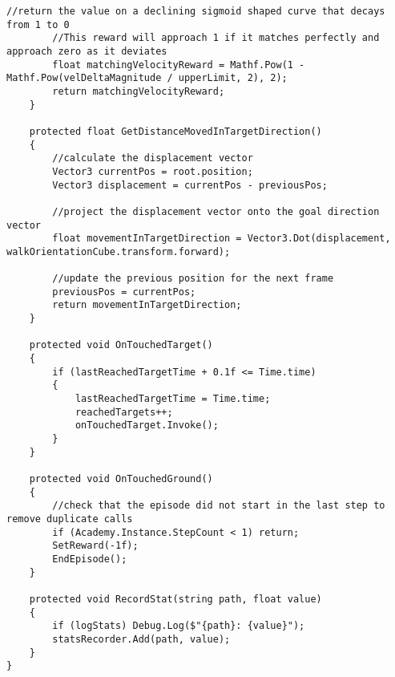 \begin{lstlisting}[caption={Agenten Skript},captionpos=b,label={lst:skript_agent1}]
        //return the value on a declining sigmoid shaped curve that decays from 1 to 0
        //This reward will approach 1 if it matches perfectly and approach zero as it deviates
        float matchingVelocityReward = Mathf.Pow(1 - Mathf.Pow(velDeltaMagnitude / upperLimit, 2), 2);
        return matchingVelocityReward;
    }

    protected float GetDistanceMovedInTargetDirection()
    {
        //calculate the displacement vector
        Vector3 currentPos = root.position;
        Vector3 displacement = currentPos - previousPos;

        //project the displacement vector onto the goal direction vector
        float movementInTargetDirection = Vector3.Dot(displacement, walkOrientationCube.transform.forward);

        //update the previous position for the next frame
        previousPos = currentPos;
        return movementInTargetDirection;
    }

    protected void OnTouchedTarget()
    {
        if (lastReachedTargetTime + 0.1f <= Time.time)
        {
            lastReachedTargetTime = Time.time;
            reachedTargets++;
            onTouchedTarget.Invoke();
        }
    }

    protected void OnTouchedGround()
    {
        //check that the episode did not start in the last step to remove duplicate calls
        if (Academy.Instance.StepCount < 1) return;
        SetReward(-1f);
        EndEpisode();
    }

    protected void RecordStat(string path, float value)
    {
        if (logStats) Debug.Log($"{path}: {value}");
        statsRecorder.Add(path, value);
    }
}
\end{lstlisting}

\newpage
